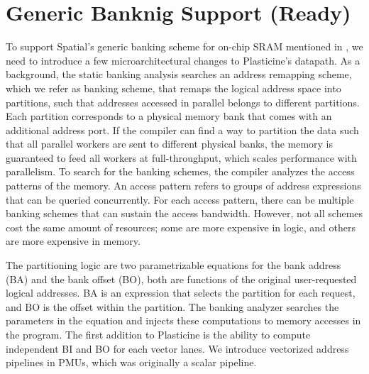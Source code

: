 \section{Generic Banknig Support (Ready)} \label{sec:banking_arch}

To support Spatial's generic banking scheme for on-chip SRAM mentioned in , 
we need to introduce a few microarchitectural changes to Plasticine's datapath.
As a background, the static banking analysis searches an address remapping scheme, which we refer as
banking scheme, that remaps the logical address space into partitions, such that addresses accessed
in parallel belongs to different partitions. 
Each partition corresponds to a physical memory bank that comes with an additional address port.
If the compiler can find a way to partition the data such that all parallel workers are sent to
different physical banks, the memory is guaranteed to feed all workers at full-throughput, which
scales performance with parallelism.
To search for the banking schemes, the compiler analyzes the access patterns of the memory.
An access pattern refers to groups of address expressions that can be queried concurrently.
For each access pattern, there can be multiple banking schemes that can sustain the access bandwidth.
However, not all schemes cost the same amount of resources; some are more expensive in logic, and
others are more expensive in memory.

The partitioning logic are two parametrizable equations for the bank address (BA) and the bank offset (BO),
both are functions of the original user-requested logical addresses.
BA is an expression that selects the partition for each request, and BO is the offset within the partition.
The banking analyzer searches the parameters in the equation and injects these computations to
memory accesses in the program. 
The first addition to Plasticine is the ability to compute independent BI and BO for each vector
lanes. 
We introduce vectorized address pipelines in PMUs, which was originally a scalar pipeline.

